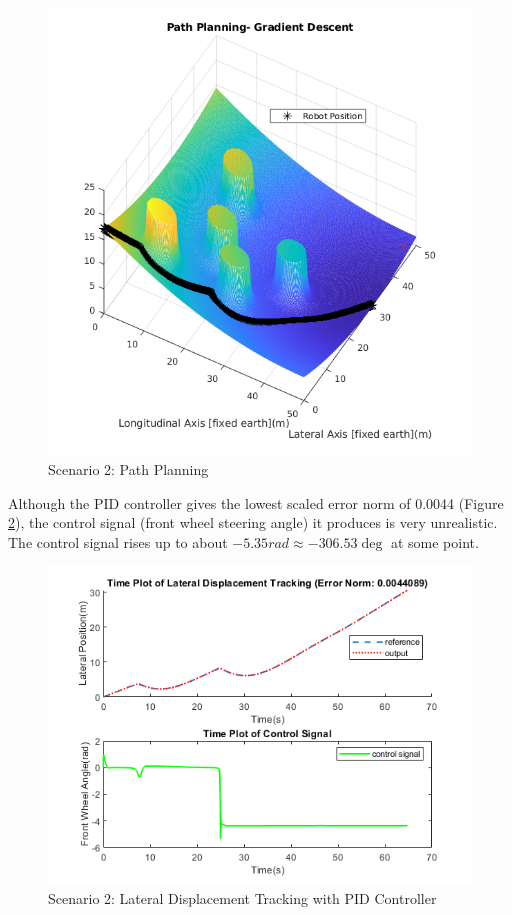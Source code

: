 \documentclass[a4paper, twocolumn]{article}
\begin{document}
\begin{figure}
    \centering
    \includegraphics[scale=0.3]{img/scenario_2/apf.png}
    \caption{Scenario 2: Path Planning}
    \label{fig:scen_2_apf}
\end{figure}

Although the PID controller gives the lowest scaled error norm of 0.0044 (Figure \ref{fig:scen_2_pid_lat}), the control signal (front wheel steering angle) it produces is very unrealistic. 
The control signal rises up to about $-5.35rad \approx -306.53\deg$ at some point. 

\begin{figure}
    \centering
    \includegraphics[scale=0.40]{img/scenario_2/pid-lateral_tracking.png}
    \caption{Scenario 2: Lateral Displacement Tracking with PID Controller}
    \label{fig:scen_2_pid_lat}
\end{figure}
\end{document}
